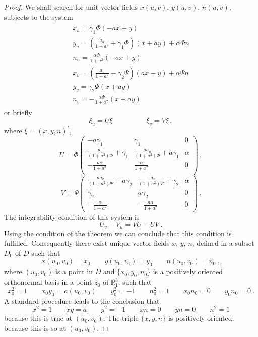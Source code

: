 \documentclass[12pt]{amsart}
\theoremstyle{definition}
\theoremstyle{remark}
\newcommand{\ds}{\displaystyle}
\begin{document}
\begin{proof}

We shall search for unit vector fields $x(u,v)$, $y(u,v)$, $n(u,v)$, subjects to the system
\begin{equation} \label{eq:MainEquationsInTheBonetTheorem}
	\begin{array}{l}
		\begin{array}{l}
		\ds x_u=\gamma_1\Phi(-ax+y)  \\
		\ds y_u=\left(\frac{a_u}{1+a^2}+\gamma_1\Phi\right)(x+ay)  +\alpha\Phi n \\
		\ds n_u=\frac{\alpha\Phi}{1+a^2}(-ax+y)    \\
		\ds x_v=\left(\frac{a_v}{1+a^2}-\gamma_2\Psi\right)(ax-y)+\alpha\Psi n   \\
		\ds y_v=\gamma_2\Psi(x+ay ) \\		
		\ds n_v=-\frac{\alpha\Psi}{1+a^2}(x+ay) 
	\end{array}
	\end{array}
\end{equation}
or briefly
$$
	\xi_u=U\xi \hspace{2cm} \xi_v=V\xi  \,,
$$
where
$\xi=(x,y,n)^t$,
$$
	U=\Phi\left(
			\begin{array}{ccc}
				\ds -a\gamma_1    & \gamma_1   &   0  \\
				\ds \frac{a_u}{(1+a^2)\Phi}+\gamma_1   & \ds \frac{aa_u}{(1+a^2)\Phi}+a\gamma_1  & \alpha  \\
				\ds -\frac{a\alpha}{1+a^2}   & \ds \frac{\alpha}{1+a^2}   &   0  \\
				\end{array}
		\right)      \,,
$$
$$
	V=\Psi\left(
			\begin{array}{ccc}
				\ds \frac{aa_v}{(1+a^2)\Psi}-a\gamma_2  & \ds \frac{-a_v}{(1+a^2)\Psi}+\gamma_2  & \alpha   \\
				\ds \gamma_2 & a\gamma_2 &  0  \\		
				\ds -\frac{\alpha}{1+a^2}  &  \ds -\frac{a\alpha}{1+a^2} &  0
			\end{array}
		\right) \,.
$$
The integrability condition of this system is
$$
	U_v-V_u=VU-UV \ .
$$
Using the condition of the theorem we can conclude that this condition is fulfilled.
Consequently there exist unique vector fields $x$, $y$, $n$, defined in a
subset $D_0$ of $D$ such that
$$
	x(u_0,v_0)=x_0 \qquad y(u_0,v_0)=y_0  \qquad n(u_0,v_0)=n_0 \ ,
$$ 
where $(u_0,v_0)$ is a point in $D$ and $\{x_0,y_0,n_0\}$ is a positively oriented orthonormal basis in a point $z_0$ of $\mathbb R^3_1$, such that 
$$
	x_0^2=1   \qquad   x_0y_0=a(u_0,v_0) \qquad y_0^2=-1   \qquad   n_0^2=1   \qquad  x_0n_0=0  \qquad  y_0n_0=0   \ .
$$
A standard procedure leads to the conclusion that 
$$
	x^2=1   \qquad   xy=a \qquad y^2=-1  \qquad  xn=0  \qquad  yn=0    \qquad   n^2=1  
$$
because this is true at $(u_0,v_0)$. 
The triple $\{x,y,n\}$ is positively oriented, because this is so at $(u_0,v_0)$.


\end{proof}
\end{document}

